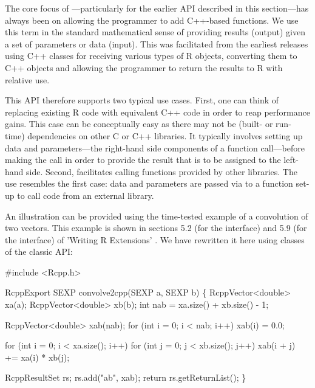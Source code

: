 The core focus of ---particularly for the earlier API described in
this section---has always been on allowing the programmer to add C++-based
functions. We use this term in the standard mathematical sense of providing
results (output) given a set of parameters or data (input). This was
facilitated from the earliest releases using C++ classes for receiving
various types of R objects, converting them to C++ objects and allowing the
programmer to return the results to R with relative use. 

This API therefore supports two typical use cases. First, one can think of
replacing existing R code with equivalent C++ code in order to reap
performance gains.  This case can be conceptually easy as there may not be
(built- or run-time) dependencies on other C or C++ libraries.  It typically
involves setting up data and parameters---the right-hand side components of a
function call---before making the call in order to provide the result that is
to be assigned to the left-hand side. Second,  facilitates calling
functions provided by other libraries. The use resembles the first case: data
and parameters are passed via  to a function set-up to call code
from an external library.  

An illustration can be provided using the time-tested example of a
convolution of two vectors. This example is shown in sections 5.2 (for the
 interface) and 5.9 (for the  interface) of 'Writing
R Extensions' \citep{R:exts}. We have rewritten it here using classes of the
classic  API:

\begin{example}
#include <Rcpp.h>

RcppExport SEXP convolve2cpp(SEXP a, SEXP b) \{
  RcppVector<double> xa(a);
  RcppVector<double> xb(b);
  int nab = xa.size() + xb.size() - 1;

  RcppVector<double> xab(nab);
  for (int i = 0; i < nab; i++) xab(i) = 0.0;

  for (int i = 0; i < xa.size(); i++)
    for (int j = 0; j < xb.size(); j++) 
       xab(i + j) += xa(i) * xb(j);

  RcppResultSet rs;
  rs.add("ab", xab);
  return rs.getReturnList();
\}
\end{example}

